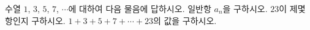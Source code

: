 수열 $1$, $3$, $5$, $7$, $\cdots$에 대하여 다음 물음에 답하시오.
 일반항 $a_n$을 구하시오.
 $23$이 제몇 항인지 구하시오.
 $1+3+5+7+\cdots+23$의 값을 구하시오.
